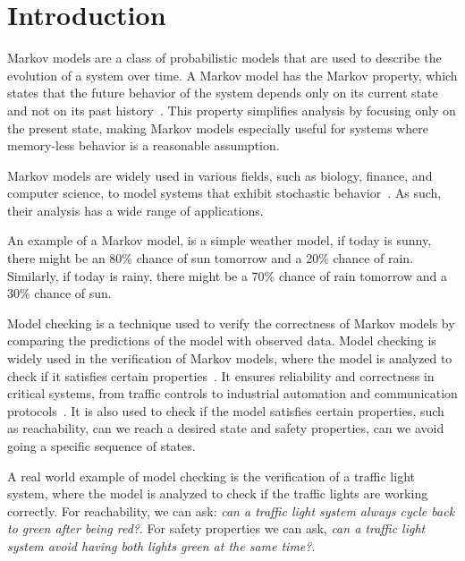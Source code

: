 \section{Introduction}\label{sec:introduction}
Markov models are a class of probabilistic models that are used to describe the evolution of a system over time.
A Markov model has the Markov property, which states that the future behavior of the system depends only on its current state and not on its past history~\cite{markov1962theory}.
This property simplifies analysis by focusing only on the present state, making Markov models especially useful for systems where memory-less behavior is a reasonable assumption.

Markov models are widely used in various fields, such as biology, finance, and computer science, to model systems that exhibit stochastic behavior~\cite{covid19_prism,ciocchetta2009bio, mamon2007hidden,lazowska1984quantitative}.
As such, their analysis has a wide range of applications.

An example of a Markov model, is a simple weather model, if today is sunny, there might be an 80\% chance of sun tomorrow and a 20\% chance of rain.
Similarly, if today is rainy, there might be a 70\% chance of rain tomorrow and a 30\% chance of sun.

Model checking is a technique used to verify the correctness of Markov models by comparing the predictions of the model with observed data.
Model checking is widely used in the verification of Markov models, where the model is analyzed to check if it satisfies certain properties~\cite{clarke1997model}.
It ensures reliability and correctness in critical systems, from traffic controls to industrial automation and communication protocols~\cite{clarke1997model}.
It is also used to check if the model satisfies certain properties, such as reachability, can we reach a desired state and safety properties, can we avoid going a specific sequence of states.

A real world example of model checking is the verification of a traffic light system, where the model is analyzed to check if the traffic lights are working correctly.
For reachability, we can ask: \textit{can a traffic light system always cycle back to green after being red?}.
For safety properties we can ask, \textit{can a traffic light system avoid having both lights green at the same time?}.

